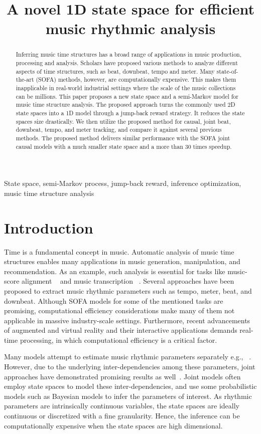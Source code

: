 \documentclass{article}
\title{A novel 1D state space for efficient music rhythmic analysis}
\begin{document}
\maketitle
\begin{abstract}
Inferring music time structures has a broad range of applications in music production, processing and analysis. Scholars have proposed various methods to
analyze different aspects of time structures, such as beat, downbeat, tempo and meter.
Many state-of-the-art (SOFA) methods, however, are computationally expensive. This makes them inapplicable in real-world industrial settings where the scale of the music collections can be millions. This paper proposes a new state space and a semi-Markov model for music time structure analysis. The proposed approach turns the commonly used 2D state spaces into a 1D model through a jump-back reward strategy. It reduces the state spaces size drastically. We then utilize the proposed method for causal, joint beat, downbeat, tempo, and meter tracking, and compare it against several previous methods. The proposed method delivers 
similar performance with the SOFA joint causal models with a much smaller state space and a more than 30 times speedup.
\end{abstract}
\begin{keywords}
State space, semi-Markov process, jump-back reward, inference optimization, music time structure analysis
\end{keywords}
\section{Introduction}
\label{sec:intro}

Time is a fundamental concept in music. Automatic analysis of music time structures enables many applications in music generation, manipulation, and recommendation. As an example, such analysis is essential for tasks like music-score alignment ~\cite{cont,duan:1} and music transcription ~\cite{shibata}. Several approaches have been proposed to extract music rhythmic parameters such as tempo, meter, beat, and downbeat. Although SOFA models for some of the mentioned tasks are promising, computational efficiency considerations make many of them not applicable in massive industry-scale settings. Furthermore, recent advancements of augmented and virtual reality and their interactive applications demands real-time processing, in which computational efficiency is a critical factor.     

Many models attempt to estimate music rhythmic parameters separately e.g.,~\cite{Durand:1,Heydari,Oliveria} . However, due to the underlying inter-dependencies among these parameters, joint approaches have demonstrated promising results as well~\cite{Bock:1,Heydari:2,Peeters:1}. Joint models often employ state spaces to model these inter-dependencies, and use some probabilistic models such as Bayesian models to infer the parameters of interest. As rhythmic parameters are intrinsically continuous variables, the state spaces are ideally continuous or discretized with a fine granularity. Hence, the inference can be computationally expensive when the state spaces are high dimensional.
\end{document}
